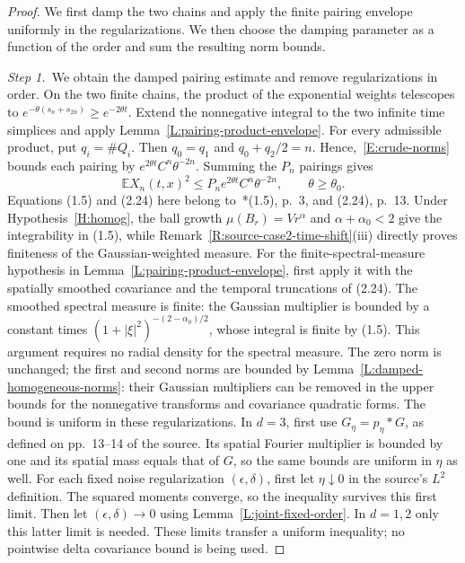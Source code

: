 \documentclass[12pt,oneside,openany]{book}
\numberwithin{equation}{section}
\theoremstyle{nogostyle}
\theoremstyle{definition}
\newcommand{\E}{\mathbb{E}}
\begin{document}
\begin{proof}
  We first damp the two chains and apply the finite pairing envelope uniformly
  in the regularizations. We then choose the damping parameter as a function
  of the order and sum the resulting norm bounds.


  \medskip
  \noindent\textit{Step 1.~}We obtain the damped pairing estimate and remove
  regularizations in order.
  On the two finite chains, the product of the exponential weights telescopes to
  $e^{-\theta(s_n+s_{2n})} \ge e^{-2\theta t}$. Extend the nonnegative integral
  to the two infinite time simplices and apply
  Lemma~\ref{L:pairing-product-envelope}. For every admissible product, put $q_i
  = \#Q_i$. Then $q_0 = q_1$ and $q_0+q_2/2 = n$. Hence,~\eqref{E:crude-norms}
  bounds each pairing by $e^{2\theta t}C^n\theta^{-2n}$. Summing the $P_n$
  pairings gives
  \begin{equation}\label{E:theta-envelope}
    \E X_n(t,x)^2\le P_n e^{2\theta t}C^n\theta^{-2n},
    \qquad\theta\ge\theta_0.
  \end{equation}
  Equations (1.5) and (2.24) here belong
  to~\cite{chen:author2026:time-dependency}*{(1.5), p.~3, and (2.24), p.~13}.
  Under Hypothesis~\ref{H:homog}, the ball growth $\mu(B_r)=Vr^\alpha$ and
  $\alpha+\alpha_0<2$ give the integrability in (1.5), while
  Remark~\ref{R:source-case2-time-shift}(iii) directly proves finiteness of
  the Gaussian-weighted measure.
  For the finite-spectral-measure hypothesis in
  Lemma~\ref{L:pairing-product-envelope}, first apply it with the spatially
  smoothed covariance and the temporal truncations of (2.24). The smoothed
  spectral measure is finite: the Gaussian multiplier is bounded by a constant
  times $(1+|\xi|^2)^{-(2-\alpha_0)/2}$, whose integral is finite by (1.5). This
  argument requires no radial density for the spectral measure. The zero norm is
  unchanged; the first and second norms are bounded by
  Lemma~\ref{L:damped-homogeneous-norms}: their Gaussian multipliers can be
  removed in the upper bounds for the nonnegative transforms and covariance
  quadratic forms. The bound is uniform in these regularizations. In $d = 3$,
  first use $G_\eta = p_\eta*G$, as defined on pp.~13--14 of the source. Its
  spatial Fourier multiplier is bounded by one and its spatial mass equals that
  of $G$, so the same bounds are uniform in $\eta$ as well. For each fixed noise
  regularization $(\epsilon,\delta)$, first let $\eta\downarrow0$ in the
  source's $L^2$ definition. The squared moments converge, so the inequality
  survives this first limit. Then let $(\epsilon,\delta) \to 0$ using
  Lemma~\ref{L:joint-fixed-order}. In $d = 1,2$ only this latter limit is
  needed. These limits transfer a uniform inequality; no pointwise delta
  covariance bound is being used.



\end{proof}
\end{document}
